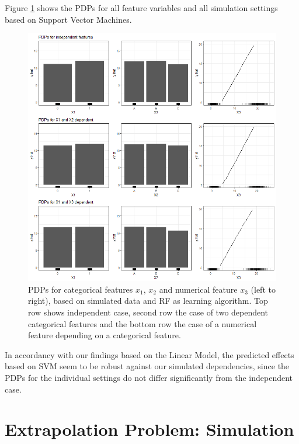 \documentclass[
]{krantz}
\begin{document}
Figure \ref{fig:Figure24} shows the PDPs for all feature variables and all simulation settings based on Support Vector Machines.

\begin{figure}

\includegraphics[width=1\linewidth]{images/VK_PDP_24_Set4_SVM} \hfill{}

\caption{PDPs for categorical features $x_1$, $x_2$ and numerical feature $x_3$ (left to right), based on simulated data and RF as learning algorithm. Top row shows independent case, second row the case of two dependent categorical features and the bottom row the case of a numerical feature depending on a categorical feature.}\label{fig:Figure24}
\end{figure}

In accordancy with our findings based on the Linear Model, the predicted effects based on SVM seem to be robust against our simulated dependencies, since the PDPs for the individual settings do not differ significantly from the independent case.

\hypertarget{ExtrapolationProblem}{%
\section{Extrapolation Problem: Simulation}\label{ExtrapolationProblem}}
\end{document}
